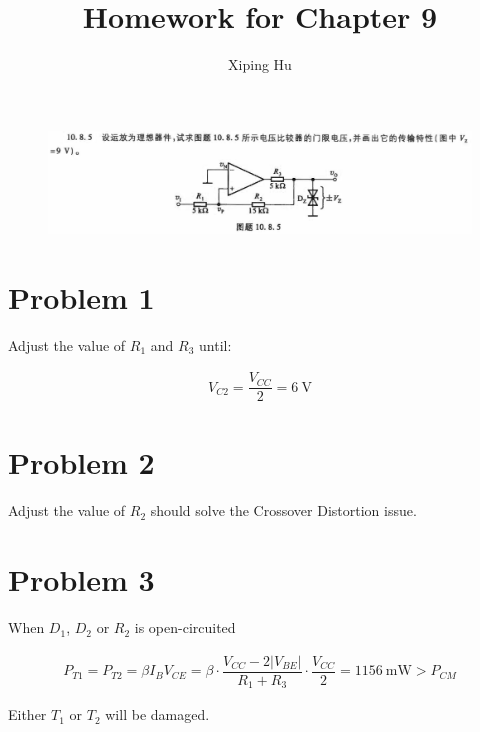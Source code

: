 \documentclass{article}
\author{Xiping Hu}
\affil{https://hxp.plus/}
\title{Homework for Chapter 9}
\newcommand{\si}[1]{\  \mathrm{#1}}
\begin{document}
\maketitle

\begin{figure}[H]
  \centering
  \includegraphics[width=\linewidth]{figures/Problem1085}
\end{figure}

\section{Problem 1}

Adjust the value of $R_1$ and $R_3$ until: 

\begin{equation*}
  \begin{aligned}
    V_{C2} = \dfrac{V_{CC}}{2} = 6 \si{V} 
  \end{aligned}
\end{equation*}

\section{Problem 2}

Adjust the value of $R_2$ should solve the Crossover Distortion issue.

\section{Problem 3}

When $D_1$, $D_2$ or $R_2$ is open-circuited

\begin{equation*}
  \begin{aligned}
    P_{T1} = P_{T2} = \beta I_B V_{CE} = \beta \cdot \dfrac{V_{CC} - 2 |V_{BE}|}{R_1 + R_3} \cdot \dfrac{V_{CC}}{2} = 1156 \si{mW} > P_{CM}  
  \end{aligned}
\end{equation*}

Either $T_1$ or $T_2$ will be damaged.
\end{document}
